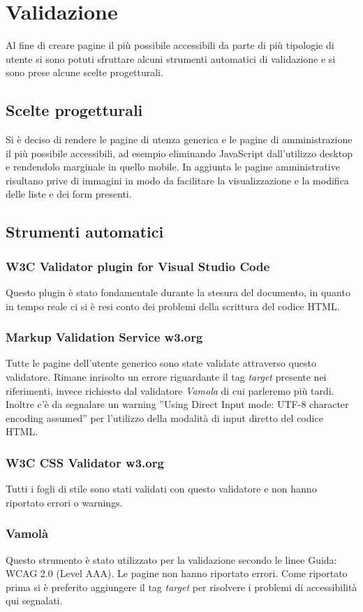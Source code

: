 \newpage
\section{Validazione}
Al fine di creare pagine il più possibile accessibili da parte di più tipologie di utente si sono potuti sfruttare alcuni strumenti automatici di validazione e si sono prese alcune scelte progetturali.
\subsection{Scelte progetturali}
Si è deciso di rendere le pagine di utenza generica e le pagine di amministrazione il più possibile accessibili, ad esempio eliminando JavaScript dall'utilizzo desktop e rendendolo marginale in quello mobile. In aggiunta le pagine amministrative risultano prive di immagini in modo da facilitare la visualizzazione e la modifica delle liste e dei form presenti.
\subsection{Strumenti automatici}
\subsubsection{W3C Validator plugin for Visual Studio Code}
Questo plugin è stato fondamentale durante la stesura del documento, in quanto in tempo reale ci si è resi conto dei problemi della scrittura del codice HTML.
\subsubsection{Markup Validation Service w3.org}
Tutte le pagine dell'utente generico sono state validate attraverso questo validatore. Rimane inrisolto un errore riguardante il tag \emph{target} presente nei riferimenti, invece richiesto dal validatore \emph{Vamola} di cui parleremo più tardi. Inoltre c'è da segnalare un warning ”Using Direct Input mode: UTF-8 character encoding assumed” per l’utilizzo della modalità di input diretto del codice HTML.
\subsubsection{W3C CSS Validator w3.org}
Tutti i fogli di stile sono stati validati con questo validatore e non hanno riportato errori o warnings.
\subsubsection{Vamolà}
Questo strumento è stato utilizzato per la validazione secondo le linee Guida: WCAG 2.0 (Level AAA). Le pagine non hanno riportato errori. Come riportato prima si è preferito aggiungere il tag \emph{target} per risolvere i problemi di accessibilità qui segnalati.
